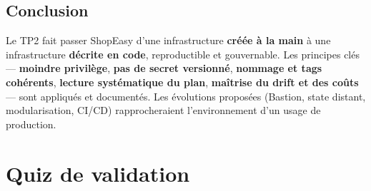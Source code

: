 \documentclass[11pt,a4paper]{article}
\begin{document}
\subsection*{Conclusion}
Le TP2 fait passer ShopEasy d'une infrastructure \textbf{créée à la main} à une infrastructure \textbf{décrite
en code}, reproductible et gouvernable. Les principes clés — \textbf{moindre privilège}, \textbf{pas de secret
versionné}, \textbf{nommage et tags cohérents}, \textbf{lecture systématique du plan}, \textbf{maîtrise du
drift et des coûts} — sont appliqués et documentés. Les évolutions proposées (Bastion, state distant,
modularisation, CI/CD) rapprocheraient l'environnement d'un usage de production.


\section{Quiz de validation}
\end{document}
